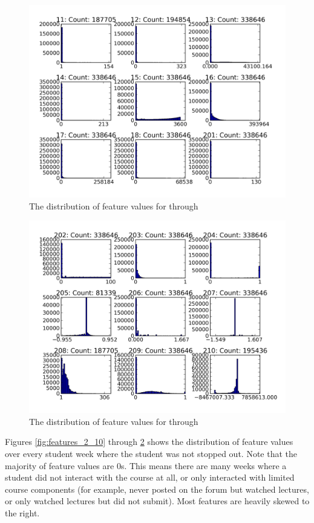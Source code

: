 \begin{figure}[ht!]
  \caption{The distribution of feature values for  through }\label{fig:features_11_19}
  \centering
    \includegraphics[width=1.0\textwidth]{figures/feature_distributions/features_11_19.png}
\end{figure}

\begin{figure}[ht!]
  \caption{The distribution of feature values for  through }\label{fig:features_20_28}
  \centering
    \includegraphics[width=1.0\textwidth]{figures/feature_distributions/features_20_28.png}
\end{figure}

Figures \ref{fig:features_2_10} through \ref{fig:features_20_28} shows the distribution of feature values over every student week where the student was not stopped out. Note that the majority of feature values are 0s. This means there are many weeks where a student did not interact with the course at all, or only interacted with limited course components (for example, never posted on the forum but watched lectures, or only watched lectures but did not submit). Most features are heavily skewed to the right.

